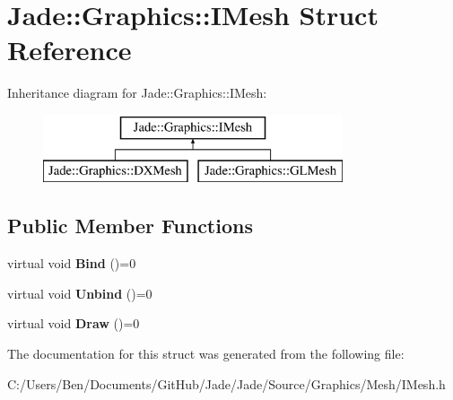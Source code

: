 \hypertarget{struct_jade_1_1_graphics_1_1_i_mesh}{}\section{Jade\+:\+:Graphics\+:\+:I\+Mesh Struct Reference}
\label{struct_jade_1_1_graphics_1_1_i_mesh}
Inheritance diagram for Jade\+:\+:Graphics\+:\+:I\+Mesh\+:\begin{figure}[H]
\begin{center}
\leavevmode
\includegraphics[height=2.000000cm]{struct_jade_1_1_graphics_1_1_i_mesh}
\end{center}
\end{figure}
\subsection*{Public Member Functions}
\begin{DoxyCompactItemize}
\item 
\hypertarget{struct_jade_1_1_graphics_1_1_i_mesh_a65551ece5a70092f3b2080b14ed95cd7}{}virtual void {\bfseries Bind} ()=0\label{struct_jade_1_1_graphics_1_1_i_mesh_a65551ece5a70092f3b2080b14ed95cd7}

\item 
\hypertarget{struct_jade_1_1_graphics_1_1_i_mesh_a55c161ccb7d622f3808aeccb21bc9fd6}{}virtual void {\bfseries Unbind} ()=0\label{struct_jade_1_1_graphics_1_1_i_mesh_a55c161ccb7d622f3808aeccb21bc9fd6}

\item 
\hypertarget{struct_jade_1_1_graphics_1_1_i_mesh_af5b1c2069f9f4b72b1a4cf97fa3b090a}{}virtual void {\bfseries Draw} ()=0\label{struct_jade_1_1_graphics_1_1_i_mesh_af5b1c2069f9f4b72b1a4cf97fa3b090a}

\end{DoxyCompactItemize}


The documentation for this struct was generated from the following file\+:\begin{DoxyCompactItemize}
\item 
C\+:/\+Users/\+Ben/\+Documents/\+Git\+Hub/\+Jade/\+Jade/\+Source/\+Graphics/\+Mesh/I\+Mesh.\+h\end{DoxyCompactItemize}
